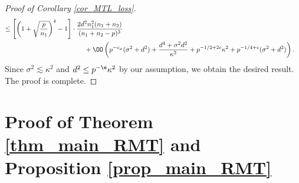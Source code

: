 \documentclass[aos,preprint]{imsart}
\begin{document}
\begin{proof}[Proof of Corollary \ref{cor_MTL_loss}]
\begin{align*}
	  \le   \left[\left( 1+\sqrt{\frac{p}{n_1}}\right)^4-1\right] \cdot \frac{2d^2n_1^2 (n_1+n_2)}{(n_1 + n_2 - p)^3} \\
	&\hspace{-2cm}+\OO\left( p^{-c_\varphi} (\sigma^2 + d^2)+ \frac{d^4 + \sigma^2 d^2}{\kappa^2}+p^{-1/2+2c}\kappa^2 +  p^{-1/4+c} (\sigma^2 +d^2) \right).
\end{align*}
Since $\sigma^2 \lesssim  \kappa^2$ and $d^2 \le p^{-\e}{\kappa^2}$ by our assumption, we obtain the desired result.
The proof is complete.
\end{proof}

 \fi



\section{Proof of Theorem \ref{thm_main_RMT} and Proposition \ref{prop_main_RMT}}\label{appendix RMT}

%



\end{document}
